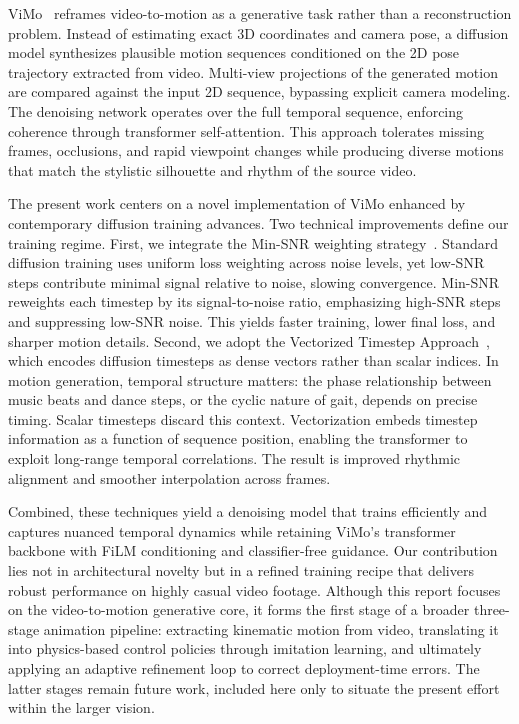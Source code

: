 ViMo~\cite{vimo2024} reframes video-to-motion as a generative task rather than a reconstruction problem. Instead of estimating exact 3D coordinates and camera pose, a diffusion model synthesizes plausible motion sequences conditioned on the 2D pose trajectory extracted from video. Multi-view projections of the generated motion are compared against the input 2D sequence, bypassing explicit camera modeling. The denoising network operates over the full temporal sequence, enforcing coherence through transformer self-attention. This approach tolerates missing frames, occlusions, and rapid viewpoint changes while producing diverse motions that match the stylistic silhouette and rhythm of the source video.

The present work centers on a novel implementation of ViMo enhanced by contemporary diffusion training advances. Two technical improvements define our training regime. First, we integrate the Min-SNR weighting strategy~\cite{minsnr2024}. Standard diffusion training uses uniform loss weighting across noise levels, yet low-SNR steps contribute minimal signal relative to noise, slowing convergence. Min-SNR reweights each timestep by its signal-to-noise ratio, emphasizing high-SNR steps and suppressing low-SNR noise. This yields faster training, lower final loss, and sharper motion details. Second, we adopt the Vectorized Timestep Approach~\cite{ptss2024}, which encodes diffusion timesteps as dense vectors rather than scalar indices. In motion generation, temporal structure matters: the phase relationship between music beats and dance steps, or the cyclic nature of gait, depends on precise timing. Scalar timesteps discard this context. Vectorization embeds timestep information as a function of sequence position, enabling the transformer to exploit long-range temporal correlations. The result is improved rhythmic alignment and smoother interpolation across frames.

Combined, these techniques yield a denoising model that trains efficiently and captures nuanced temporal dynamics while retaining ViMo’s transformer backbone with FiLM conditioning and classifier-free guidance. Our contribution lies not in architectural novelty but in a refined training recipe that delivers robust performance on highly casual video footage. Although this report focuses on the video-to-motion generative core, it forms the first stage of a broader three-stage animation pipeline: extracting kinematic motion from video, translating it into physics-based control policies through imitation learning, and ultimately applying an adaptive refinement loop to correct deployment-time errors. The latter stages remain future work, included here only to situate the present effort within the larger vision.